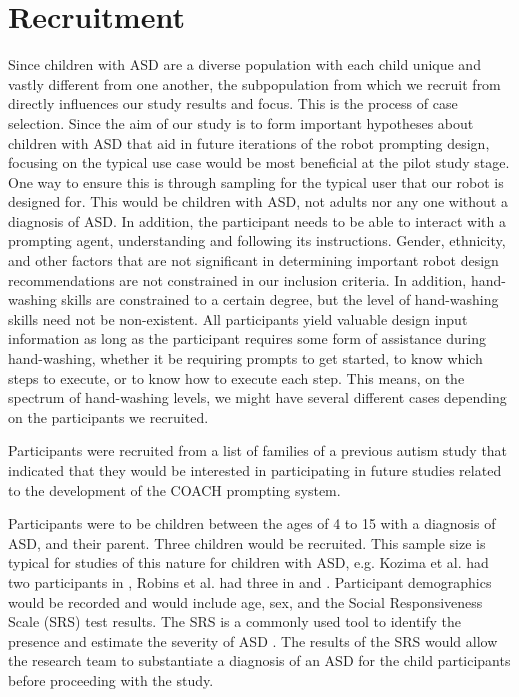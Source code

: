 \section{Recruitment}
\label{sec:Recruitment}
Since children with ASD are a diverse population with each child unique and vastly different from one another, the subpopulation from which we recruit from directly influences our study results and focus.  This is the process of case selection.  Since the aim of our study is to form important hypotheses about children with ASD that aid in future iterations of the robot prompting design, focusing on the typical use case would be most beneficial at the pilot study stage.  One way to ensure this is through sampling for the typical user that our robot is designed for.  This would be children with ASD, not adults nor any one without a diagnosis of ASD.  In addition, the participant needs to be able to interact with a prompting agent, understanding and following its instructions.  Gender, ethnicity, and other factors that are not significant in determining important robot design recommendations are not constrained in our inclusion criteria.  In addition, hand-washing skills are constrained to a certain degree, but the level of hand-washing skills need not be non-existent.  All participants yield valuable design input information as long as the participant requires some form of assistance during hand-washing, whether it be requiring prompts to get started, to know which steps to execute, or to know how to execute each step.  This means, on the spectrum of hand-washing levels, we might have several different cases depending on the participants we recruited.

Participants were recruited from a list of families of a previous autism study that indicated that they would be interested in participating in future studies related to the development of the COACH prompting system.

Participants were to be children between the ages of 4 to 15 with a diagnosis of ASD, and their parent. Three children would be recruited. This sample size is typical for studies of this nature for children with ASD, e.g. Kozima et al. had two participants in
\cite{kozima2005interactive}, Robins et al. had three in \cite{robins2004robot} and \cite{robins2009isolation}.  Participant demographics would be recorded and would include age, sex, and the Social Responsiveness Scale (SRS) test results.  The SRS is a commonly used tool to identify the presence and estimate the severity of ASD \cite{constantino2002social}. The results of the SRS would allow the research team to substantiate a diagnosis of an ASD for the child participants before proceeding with the study.

